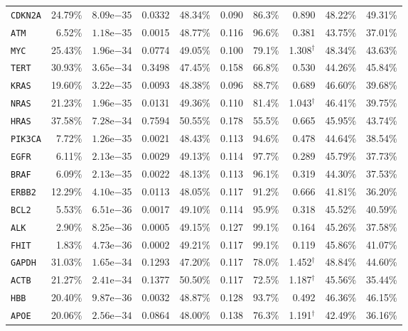 \documentclass[11pt, a4paper]{article}
\DeclareRobustCommand{\_}{\textunderscore\allowbreak}
\begin{document}
\begin{table}[htbp]
{\begin{tabular}{@{}lrrrrrrrrr@{}}
\texttt{CDKN2A} & 24.79\% & $8.09\mathrm{e}{-35}$ & 0.0332 & 48.34\% & 0.090 & 86.3\% & 0.890 & 48.22\% & 49.31\% \\
\texttt{ATM} & 6.52\% & $1.18\mathrm{e}{-35}$ & 0.0015 & 48.77\% & 0.116 & 96.6\% & 0.381 & 43.75\% & 37.01\% \\
\midrule
\texttt{MYC} & 25.43\% & $1.96\mathrm{e}{-34}$ & 0.0774 & 49.05\% & 0.100 & 79.1\% & 1.308$^{\dagger}$ & 48.34\% & 43.63\% \\
\texttt{TERT} & 30.93\% & $3.65\mathrm{e}{-34}$ & 0.3498 & 47.45\% & 0.158 & 66.8\% & 0.530 & 44.26\% & 45.84\% \\
\texttt{KRAS} & 19.60\% & $3.22\mathrm{e}{-35}$ & 0.0093 & 48.38\% & 0.096 & 88.7\% & 0.689 & 46.60\% & 39.68\% \\
\texttt{NRAS} & 21.23\% & $1.96\mathrm{e}{-35}$ & 0.0131 & 49.36\% & 0.110 & 81.4\% & 1.043$^{\dagger}$ & 46.41\% & 39.75\% \\
\texttt{HRAS} & 37.58\% & $7.28\mathrm{e}{-34}$ & 0.7594 & 50.55\% & 0.178 & 55.5\% & 0.665 & 45.95\% & 43.74\% \\
\texttt{PIK3CA} & 7.72\% & $1.26\mathrm{e}{-35}$ & 0.0021 & 48.43\% & 0.113 & 94.6\% & 0.478 & 44.64\% & 38.54\% \\
\texttt{EGFR} & 6.11\% & $2.13\mathrm{e}{-35}$ & 0.0029 & 49.13\% & 0.114 & 97.7\% & 0.289 & 45.79\% & 37.73\% \\
\texttt{BRAF} & 6.09\% & $2.13\mathrm{e}{-35}$ & 0.0022 & 48.13\% & 0.113 & 96.1\% & 0.319 & 44.30\% & 37.53\% \\
\texttt{ERBB2} & 12.29\% & $4.10\mathrm{e}{-35}$ & 0.0113 & 48.05\% & 0.117 & 91.2\% & 0.666 & 41.81\% & 36.20\% \\
\texttt{BCL2} & 5.53\% & $6.51\mathrm{e}{-36}$ & 0.0017 & 49.10\% & 0.114 & 95.9\% & 0.318 & 45.52\% & 40.59\% \\
\texttt{ALK} & 2.90\% & $8.25\mathrm{e}{-36}$ & 0.0005 & 49.15\% & 0.127 & 99.1\% & 0.164 & 45.26\% & 37.58\% \\
\texttt{FHIT} & 1.83\% & $4.73\mathrm{e}{-36}$ & 0.0002 & 49.21\% & 0.117 & 99.1\% & 0.119 & 45.86\% & 41.07\% \\
\midrule
\texttt{GAPDH} & 31.03\% & $1.65\mathrm{e}{-34}$ & 0.1293 & 47.20\% & 0.117 & 78.0\% & 1.452$^{\dagger}$ & 48.84\% & 44.60\% \\
\texttt{ACTB} & 21.27\% & $2.41\mathrm{e}{-34}$ & 0.1377 & 50.50\% & 0.117 & 72.5\% & 1.187$^{\dagger}$ & 45.56\% & 35.44\% \\
\texttt{HBB} & 20.40\% & $9.87\mathrm{e}{-36}$ & 0.0032 & 48.87\% & 0.128 & 93.7\% & 0.492 & 46.36\% & 46.15\% \\
\texttt{APOE} & 20.06\% & $2.56\mathrm{e}{-34}$ & 0.0864 & 48.00\% & 0.138 & 76.3\% & 1.191$^{\dagger}$ & 42.49\% & 36.16\% \\
\bottomrule
\end{tabular}
}
\end{table}
\end{document}
